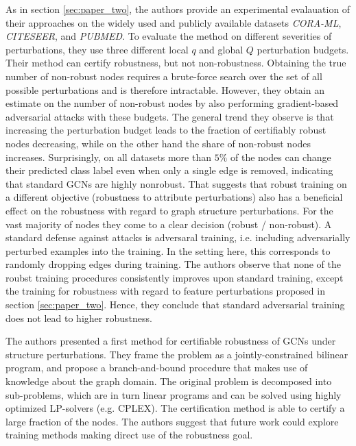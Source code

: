 \documentclass[a4paper,preprint]{sig-alternate}
\begin{document}
As in section \ref{sec:paper_two}, the authors provide an experimental evalauation of their approaches on the widely used and publicly available 
datasets \textit{CORA-ML}, \textit{CITESEER}, and \textit{PUBMED}.
To evaluate the method on different severities of perturbations, they use three different local $q$ and global $Q$ perturbation budgets. 
Their method can certify robustness, but not non-robustness. Obtaining the true number of non-robust nodes requires a brute-force search over 
the set of all possible perturbations and is therefore intractable. However, they obtain an estimate on the number of non-robust nodes by also 
performing gradient-based adversarial attacks with these budgets. The general trend they observe is that increasing the perturbation budget leads 
to the fraction of certifiably robust nodes decreasing, while on the other hand the share of non-robust nodes increases. 
Surprisingly, on all datasets more than $5\%$ of the nodes can change their predicted class label even when only a single edge is removed, 
indicating that standard GCNs are highly nonrobust. That suggests that robust training on a different objective (robustness to attribute perturbations)
also has a beneficial effect on the robustness with regard to graph structure perturbations. For the vast majority of nodes they come to a clear 
decision (robust / non-robust).\newline
A standard defense against attacks is adversaral training, i.e. including adversarially perturbed examples into the training.
In the setting here, this corresponds to randomly dropping edges during training. The authors observe that none of the roubst training procedures
consistently improves upon standard training, except the training for robustness with regard to feature perturbations proposed
in section \ref{sec:paper_two}. Hence, they conclude that standard adversarial training does not lead to higher robustness.\newline

The authors presented a first method for certifiable robustness of GCNs under structure perturbations. 
They frame the problem as a jointly-constrained bilinear program, and propose a branch-and-bound procedure that makes use of knowledge
about the graph domain. The original problem is decomposed into sub-problems, which are in turn linear programs and can be solved using
highly optimized LP-solvers (e.g. CPLEX). The certification method is able to certify a large fraction of the nodes.
The authors suggest that future work could explore training methods making direct use of the robustness goal.
\end{document}
